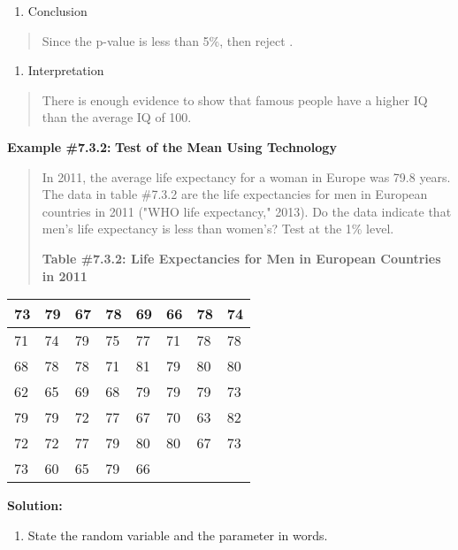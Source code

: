 \documentclass[]{book}
\providecommand{\tightlist}{%
  \setlength{\itemsep}{0pt}\setlength{\parskip}{0pt}}
\begin{document}
\begin{enumerate}
\def\labelenumi{\arabic{enumi}.}
\setcounter{enumi}{4}
\tightlist
\item
  Conclusion
\end{enumerate}

\begin{quote}
Since the p-value is less than 5\%, then reject .
\end{quote}

\begin{enumerate}
\def\labelenumi{\arabic{enumi}.}
\setcounter{enumi}{5}
\tightlist
\item
  Interpretation
\end{enumerate}

\begin{quote}
There is enough evidence to show that famous people have a higher IQ
than the average IQ of 100.
\end{quote}

\textbf{Example \#7.3.2:} \textbf{Test of the Mean Using Technology}

\begin{quote}
In 2011, the average life expectancy for a woman in Europe was 79.8
years. The data in table \#7.3.2 are the life expectancies for men in
European countries in 2011 ("WHO life expectancy," 2013). Do the
data indicate that men's life expectancy is less than women's? Test at
the 1\% level.

\textbf{Table \#7.3.2: Life Expectancies for Men in European Countries in
2011}
\end{quote}

\begin{longtable}[]{@{}llllllll@{}}
\toprule
73 & 79 & 67 & 78 & 69 & 66 & 78 & 74\tabularnewline
\midrule
\endhead
71 & 74 & 79 & 75 & 77 & 71 & 78 & 78\tabularnewline
68 & 78 & 78 & 71 & 81 & 79 & 80 & 80\tabularnewline
62 & 65 & 69 & 68 & 79 & 79 & 79 & 73\tabularnewline
79 & 79 & 72 & 77 & 67 & 70 & 63 & 82\tabularnewline
72 & 72 & 77 & 79 & 80 & 80 & 67 & 73\tabularnewline
73 & 60 & 65 & 79 & 66 & & &\tabularnewline
\bottomrule
\end{longtable}

\textbf{Solution:}

\begin{enumerate}
\def\labelenumi{\arabic{enumi}.}
\tightlist
\item
  State the random variable and the parameter in words.
\end{enumerate}
\end{document}
